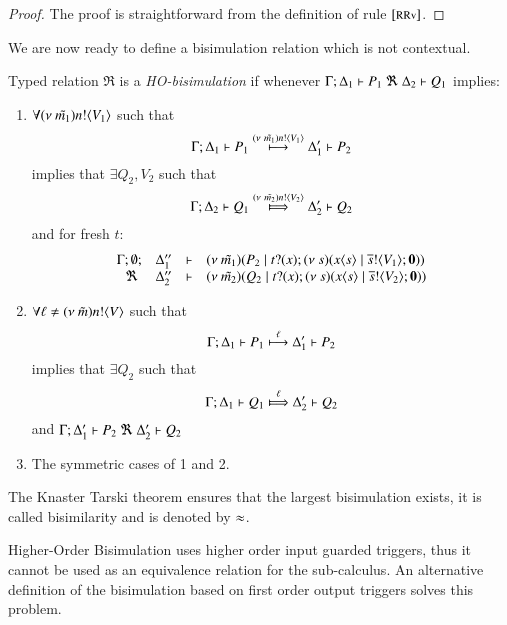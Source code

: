 \begin{proof}
	The proof is straightforward from the definition of rule ${\footnotesize [\textrm{RRv}]}$.
\end{proof}

We are now ready to define a bisimulation relation which is not
contextual.


\begin{definition}\rm
	\label{def:HO_bisim}
	Typed relation
	$\Re$ is a {\em HO-bisimulation} if whenever
	$\horel{\Gamma}{\Delta_1}{P_1}{\ \Re\ }{\Delta_2}{Q_1}$ implies:
%
	\begin{enumerate}
		\item	$\forall (\nu\ \tilde{m_1}) n ! \langle V_1 \rangle$ such that
			\[
				\Gamma; \Delta_1 \vdash P_1 \stackrel{(\nu\ \tilde{m_1}) n ! \langle V_1 \rangle}{\longmapsto} \Delta_1' \vdash P_2
			\]
			implies that $\exists Q_2, V_2$ such that
			\[
				\horel{\Gamma}{\Delta_2}{Q_1}{\Hby{\news{\tilde{m_2}} \bactout{n}{V_2}}}{\Delta_2'}{Q_2}
			\]
			and for fresh $t$:
			\[
				\begin{array}{rcll} \Gamma; \emptyset; &\Delta_1''& \vdash& (\nu\ \tilde{m_1})(P_2 \;|\; t ? (x) ; (\nu\ s)(x\langle s \rangle \;|\; \overline{s} ! \langle V_1 \rangle ; \mathbf{0}))\\ \ \Re\  &\Delta_2''& \vdash &  (\nu\ \tilde{m_2})(Q_2 \;|\; t ? (x) ; (\nu\ s)(x\langle s \rangle \;|\; \overline{s} ! \langle V_2 \rangle ; \mathbf{0})) \end{array}
			\]
%
		\item	$\forall \ell \not= (\nu\ \tilde{m}) n ! \langle V \rangle$ such that
			\[
				\Gamma; \Delta_1 \vdash P_1 \stackrel{\ell}{\longmapsto} \Delta_1' \vdash P_2
			\]
			implies that $\exists Q_2$ such that 
			\[
				\horel{\Gamma}{\Delta_1}{Q_1}{\Hby{\ell}}{\Delta_2'}{Q_2}
			\]
			and
			$\horel{\Gamma}{\Delta_1'}{P_2}{\ \Re\ }{\Delta_2'}{Q_2}$

		\item	The symmetric cases of 1 and 2.
	\end{enumerate}
	The Knaster Tarski theorem ensures that the largest bisimulation exists,
	it is called bisimilarity and is denoted by $\approx$.
\end{definition}

Higher-Order Bisimulation uses higher order input guarded triggers, thus
it cannot be used as an equivalence relation for the \sessp sub-calculus.
An alternative definition of the bisimulation based on first order
output triggers solves this problem.

